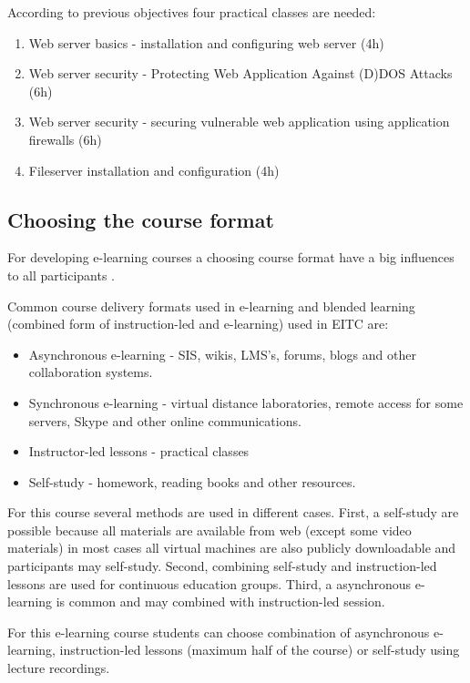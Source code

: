 According to previous objectives four practical classes are needed:
\begin{enumerate}[label=LAB \arabic*.,leftmargin=*]
   \item Web server basics - installation and configuring web server (4h)
  	\item Web server security - Protecting Web Application Against (D)DOS Attacks (6h)
  	\item Web server security - securing vulnerable web application using application firewalls (6h)
  	\item Fileserver installation and configuration (4h)
\end{enumerate}


\subsection{Choosing the course format}

For developing e-learning courses a choosing course format have a big influences to all participants \citep[p.14]{OppeArenduskeskus2010}. 

Common course delivery formats used in e-learning and blended learning (combined form of instruction-led and e-learning) used in \gls{EITC} are: 
\begin{itemize}
\item Asynchronous e-learning - \gls{SIS}, wikis, \gls{LMS}'s, forums, blogs and other collaboration systems.
\item Synchronous e-learning - virtual distance laboratories, remote access for some servers, Skype and other online communications.
\item Instructor-led lessons - practical classes
\item Self-study - homework, reading books and other resources.
\end{itemize}

For this course several methods are used in different cases. First, a self-study are possible because all materials are available from web (except some video materials) in most cases all virtual machines are also publicly downloadable and participants may self-study. Second, combining self-study and instruction-led lessons are used for continuous education groups. Third, a asynchronous e-learning is common and may combined with instruction-led session.

For this e-learning course students can choose combination of asynchronous e-learning, instruction-led lessons (maximum half of the course) or self-study using lecture recordings.

